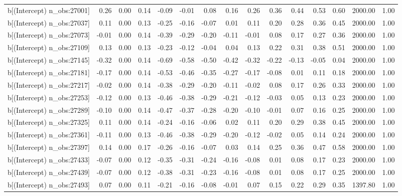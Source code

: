 \begin{table}[ht]
\begin{tabular}{rrrrrrrrrrrrrrr}
  b[(Intercept) n\_obs:27001] & 0.26 & 0.00 & 0.14 & -0.09 & -0.01 & 0.08 & 0.16 & 0.26 & 0.36 & 0.44 & 0.53 & 0.60 & 2000.00 & 1.00 \\ 
  b[(Intercept) n\_obs:27037] & 0.11 & 0.00 & 0.13 & -0.25 & -0.16 & -0.07 & 0.01 & 0.11 & 0.20 & 0.28 & 0.36 & 0.45 & 2000.00 & 1.00 \\ 
  b[(Intercept) n\_obs:27073] & -0.01 & 0.00 & 0.14 & -0.39 & -0.29 & -0.20 & -0.11 & -0.01 & 0.08 & 0.17 & 0.27 & 0.36 & 2000.00 & 1.00 \\ 
  b[(Intercept) n\_obs:27109] & 0.13 & 0.00 & 0.13 & -0.23 & -0.12 & -0.04 & 0.04 & 0.13 & 0.22 & 0.31 & 0.38 & 0.51 & 2000.00 & 1.00 \\ 
  b[(Intercept) n\_obs:27145] & -0.32 & 0.00 & 0.14 & -0.69 & -0.58 & -0.50 & -0.42 & -0.32 & -0.22 & -0.13 & -0.05 & 0.04 & 2000.00 & 1.00 \\ 
  b[(Intercept) n\_obs:27181] & -0.17 & 0.00 & 0.14 & -0.53 & -0.46 & -0.35 & -0.27 & -0.17 & -0.08 & 0.01 & 0.11 & 0.18 & 2000.00 & 1.00 \\ 
  b[(Intercept) n\_obs:27217] & -0.02 & 0.00 & 0.14 & -0.38 & -0.29 & -0.20 & -0.11 & -0.02 & 0.08 & 0.17 & 0.26 & 0.33 & 2000.00 & 1.00 \\ 
  b[(Intercept) n\_obs:27253] & -0.12 & 0.00 & 0.13 & -0.46 & -0.38 & -0.29 & -0.21 & -0.12 & -0.03 & 0.05 & 0.13 & 0.23 & 2000.00 & 1.00 \\ 
  b[(Intercept) n\_obs:27289] & -0.10 & 0.00 & 0.14 & -0.47 & -0.37 & -0.28 & -0.20 & -0.10 & -0.01 & 0.07 & 0.16 & 0.25 & 2000.00 & 1.00 \\ 
  b[(Intercept) n\_obs:27325] & 0.11 & 0.00 & 0.14 & -0.24 & -0.16 & -0.06 & 0.02 & 0.11 & 0.20 & 0.29 & 0.38 & 0.45 & 2000.00 & 1.00 \\ 
  b[(Intercept) n\_obs:27361] & -0.11 & 0.00 & 0.13 & -0.46 & -0.38 & -0.29 & -0.20 & -0.12 & -0.02 & 0.05 & 0.14 & 0.24 & 2000.00 & 1.00 \\ 
  b[(Intercept) n\_obs:27397] & 0.14 & 0.00 & 0.17 & -0.26 & -0.16 & -0.07 & 0.03 & 0.14 & 0.25 & 0.36 & 0.47 & 0.58 & 2000.00 & 1.00 \\ 
  b[(Intercept) n\_obs:27433] & -0.07 & 0.00 & 0.12 & -0.35 & -0.31 & -0.24 & -0.16 & -0.08 & 0.01 & 0.08 & 0.17 & 0.23 & 2000.00 & 1.00 \\ 
  b[(Intercept) n\_obs:27439] & -0.07 & 0.00 & 0.12 & -0.38 & -0.31 & -0.23 & -0.16 & -0.08 & 0.01 & 0.08 & 0.17 & 0.25 & 2000.00 & 1.00 \\ 
  b[(Intercept) n\_obs:27493] & 0.07 & 0.00 & 0.11 & -0.21 & -0.16 & -0.08 & -0.01 & 0.07 & 0.15 & 0.22 & 0.29 & 0.35 & 1397.80 & 1.00 \\ 

\end{tabular}
\end{table}
